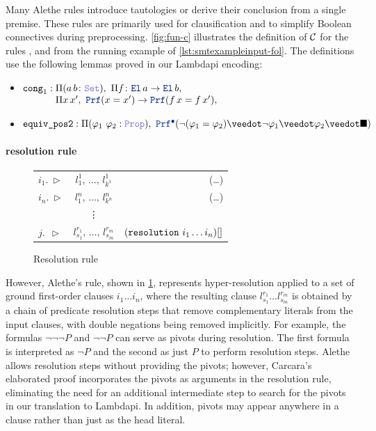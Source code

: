 Many Alethe rules introduce tautologies or derive their conclusion from a single premise.
%
These rules are primarily used for clausification and to simplify Boolean connectives during
preprocessing.
%
\cref{fig:fun-c} illustrates the definition of $\cal{C}$ for the rules ,  and  from the running example of \cref{lst:smtexampleinput-fol}.
The definitions use the following lemmas proved in our Lambdapi encoding:
\begin{itemize}
\item $\kw{cong}_1 :
    \begin{array}[t]{@{}l@{}}
        \Pi (a\,b \colon \set),\ \Pi f \colon \el\,a \ra \el\,b, \\
        \Pi x\,x',\ \prf (x = x') \ra \prf (f\,x = f\,x'),
    \end{array}$
\item $\kw{equiv\_pos2} : \Pi (\varphi_1~\varphi_2: \prop),\ \pid (\neg (\varphi_1 = \varphi_2) \veedot \neg \varphi_1 \veedot \varphi_2 \veedot \nil )$
\end{itemize}



\paragraph{resolution rule}

\begin{figure}[t]
  \centering
  \begin{tabular}{l c r}
  $i_1.~\triangleright$  & \qquad $l_1^1,\, \dots,\, l_{k^1}^1$ \qquad & (\dots)  \\
  $i_n.~\triangleright$  & \qquad $l_1^n,\, \dots,\, l_{k^n}^n$ \qquad & (\dots) \\
    & \vdots  &  \\
  $j.~~\triangleright$  & \qquad $l_{s_1}^{r_1},\, \dots,\, l_{s_m}^{r_m}$ \qquad & $(\kw{resolution}~i_1 \dots i_n)[]$
  \end{tabular}
  \caption{Resolution rule}
  \label{fig:resolution-rule}
\end{figure}

However, Alethe's  rule, shown in \cref{fig:resolution-rule}, represents hyper-resolution applied to a set of ground first-order clauses $i_1 \dots i_n$,
where the resulting clause $l_{s_1}^{r_1} \dots l_{s_m}^{r_m}$ is obtained by a chain of predicate resolution steps that remove complementary literals from the input clauses, with double negations being removed implicitly.
For example, the formulas $\neg \neg \neg P$ and $\neg \neg P$ can serve as pivots during resolution.
The first formula is interpreted as $\neg P$ and the second as just $P$ to perform resolution steps.
Alethe allows resolution steps without providing the pivots; however, Carcara's elaborated proof incorporates the pivots as arguments in the resolution rule, eliminating the need for an additional intermediate step to search for the pivots in our translation to Lambdapi.
In addition, pivots may appear anywhere in a clause rather than just as the head literal.

